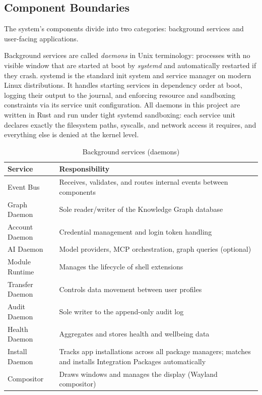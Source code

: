 \subsection{Component Boundaries}
\label{sec:component-boundaries}

The system's components divide into two categories: background services and
user-facing applications.

Background services are called \emph{daemons} in Unix terminology: processes
with no visible window that are started at boot by \emph{systemd} and
automatically restarted if they crash. systemd is the standard init system and
service manager on modern Linux distributions. It handles starting services in
dependency order at boot, logging their output to the journal, and enforcing
resource and sandboxing constraints via its service unit configuration. All
daemons in this project are written in Rust and run under tight systemd
sandboxing: each service unit declares exactly the filesystem paths, syscalls,
and network access it requires, and everything else is denied at the kernel
level.

\begin{table}[htbp]
\caption{Background services (daemons)}
\label{tab:daemons}
\begin{tabularx}{\linewidth}{lX}
\toprule
\textbf{Service} & \textbf{Responsibility} \\
\midrule
Event Bus       & Receives, validates, and routes internal events between components \\
Graph Daemon    & Sole reader/writer of the Knowledge Graph database \\
Account Daemon  & Credential management and login token handling \\
AI Daemon       & Model providers, MCP orchestration, graph queries (optional) \\
Module Runtime  & Manages the lifecycle of shell extensions \\
Transfer Daemon & Controls data movement between user profiles \\
Audit Daemon    & Sole writer to the append-only audit log \\
Health Daemon   & Aggregates and stores health and wellbeing data \\
Install Daemon  & Tracks app installations across all package managers; matches and installs Integration Packages automatically \\
Compositor      & Draws windows and manages the display (Wayland compositor) \\
\bottomrule
\end{tabularx}
\end{table}

